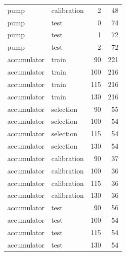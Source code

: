 \begin{tabular}{llrr}
pump & calibration & 2 & 48\\
pump & test & 0 & 74\\
pump & test & 1 & 72\\
pump & test & 2 & 72\\
accumulator & train & 90 & 221\\
accumulator & train & 100 & 216\\
accumulator & train & 115 & 216\\
accumulator & train & 130 & 216\\
accumulator & selection & 90 & 55\\
accumulator & selection & 100 & 54\\
accumulator & selection & 115 & 54\\
accumulator & selection & 130 & 54\\
accumulator & calibration & 90 & 37\\
accumulator & calibration & 100 & 36\\
accumulator & calibration & 115 & 36\\
accumulator & calibration & 130 & 36\\
accumulator & test & 90 & 56\\
accumulator & test & 100 & 54\\
accumulator & test & 115 & 54\\
accumulator & test & 130 & 54\\
\bottomrule
\end{tabular}
